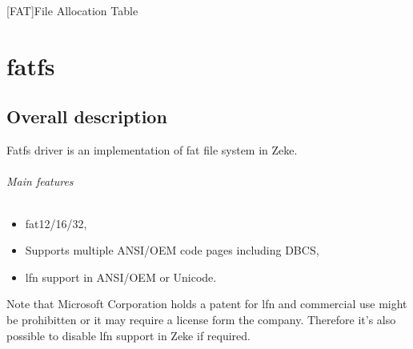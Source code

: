 [FAT]{File Allocation Table}

\chapter{fatfs}

\section{Overall description}

Fatfs driver is an implementation of \acf{fat} file system in Zeke.

\subparagraph{Main features}
\begin{itemize}
    \item \acs{fat}12/16/32,
    \item Supports multiple ANSI/OEM code pages including DBCS,
    \item \acf{lfn} support in ANSI/OEM or Unicode.
\end{itemize}

Note that Microsoft Corporation holds a patent for \ac{lfn} and commercial
use might be prohibitten or it may require a license form the company.
Therefore it's also possible to disable \acs{lfn} support in Zeke if required.
